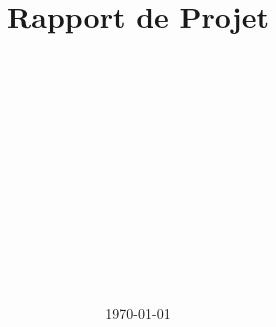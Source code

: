 \usepackage[utf8]{inputenc}

\usepackage[T1]{fontenc}
\usepackage{fontawesome}
\usepackage{eurosym}

\usepackage[french]{babel}

\usepackage{fancyhdr}
\usepackage{graphicx}
\usepackage[left=4cm,right=4cm,top=4cm,bottom=5.1cm,textheight=25cm]{geometry}
\usepackage{wrapfig}

\usepackage{eso-pic}
\usepackage{transparent}

\usepackage{hyperref}
\usepackage{setspace}

\usepackage{titletoc}

\usepackage{stackengine,xcolor}


\newcommand\BackgroundPic{%
	\put(0,-50){%
		\parbox[b][\paperheight]{\paperwidth}{%
			\centering
			\texttt{[image: ../images/icone.jpg]}%
			\vfill
		}
	}
}

\fboxrule=2pt
\newcommand\cincludegraphics[2][]{%
  \setbox0=\hbox{\texttt{[image: \#2]}}%
  \abovebaseline[-.5\ht0]{\texttt{[image: \#2]}}}

  
\renewcommand{\baselinestretch}{1.15}
\renewcommand{\partname}{}

\title{\textbf{{\Huge Rapport de Projet}}}
\author{
	\\
	 \\ \\
	 \\ \\ \\
	 \\
	 \\
	 \\
	 \\ \\ \\
}
\date{{\LARGE \today}}

\pagestyle{fancy}
\fancyfoot[L]{\cincludegraphics[scale=0.1]{../images/ShadowMiners_logo.png}} %

\setcounter{tocdepth}{3}